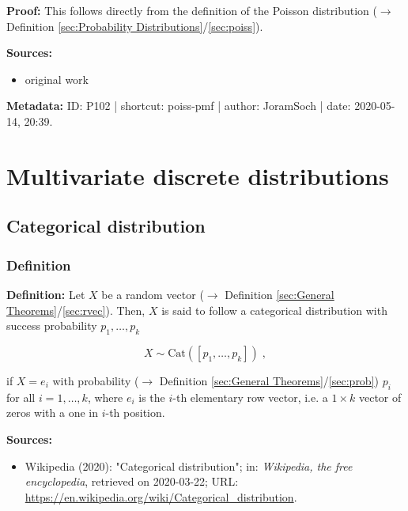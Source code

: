\documentclass[a4paper,12pt,twoside]{book}
\begin{document}
\vspace{1em}
\textbf{Proof:} This follows directly from the definition of the Poisson distribution ($\rightarrow$ Definition \ref{sec:Probability Distributions}/\ref{sec:poiss}).


\vspace{1em}
\textbf{Sources:}
\begin{itemize}
\item original work\end{itemize}


\vspace{1em}
\textbf{Metadata:} ID: P102 | shortcut: poiss-pmf | author: JoramSoch | date: 2020-05-14, 20:39.
\vspace{1em}



\pagebreak
\section{Multivariate discrete distributions}

\subsection{Categorical distribution}

\subsubsection[\textit{Definition}]{Definition} \label{sec:cat}
\setcounter{equation}{0}

\textbf{Definition:} Let $X$ be a random vector ($\rightarrow$ Definition \ref{sec:General Theorems}/\ref{sec:rvec}). Then, $X$ is said to follow a categorical distribution with success probability $p_1, \ldots, p_k$

\begin{equation} \label{eq:cat-cat}
X \sim \mathrm{Cat}(\left[p_1, \ldots, p_k \right]) \; ,
\end{equation}

if $X = e_i$ with probability ($\rightarrow$ Definition \ref{sec:General Theorems}/\ref{sec:prob}) $p_i$ for all $i = 1, \ldots, k$, where $e_i$ is the $i$-th elementary row vector, i.e. a $1 \times k$ vector of zeros with a one in $i$-th position.


\vspace{1em}
\textbf{Sources:}
\begin{itemize}
\item Wikipedia (2020): "Categorical distribution"; in: \textit{Wikipedia, the free encyclopedia}, retrieved on 2020-03-22; URL: \url{https://en.wikipedia.org/wiki/Categorical_distribution}.
\end{itemize}
\end{document}
